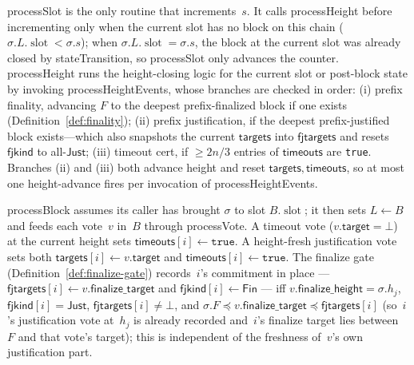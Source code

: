 \ifx\litemode\undefined\documentclass{article}\fi
\newcommand{\slot}[0]{\ensuremath{\operatorname{\mathrm{slot}}}}
\newcommand{\target}{\mathsf{target}}
\newcommand{\finalizeHeight}{\mathsf{finalize\_height}}
\newcommand{\finalizeTarget}{\mathsf{finalize\_target}}
\newcommand{\targets}{\mathsf{targets}}
\newcommand{\timeouts}{\mathsf{timeouts}}
\newcommand{\fjtargets}{\mathsf{fjtargets}}
\newcommand{\fjkind}{\mathsf{fjkind}}
\newcommand{\kjust}{\mathsf{Just}}
\newcommand{\kfin}{\mathsf{Fin}}
\newcommand{\stateTransition}{\textsf{stateTransition}\xspace}
\newcommand{\processSlot}{\textsf{processSlot}\xspace}
\newcommand{\processBlock}{\textsf{processBlock}\xspace}
\newcommand{\processHeight}{\textsf{processHeight}\xspace}
\newcommand{\processHeightEvents}{\textsf{processHeightEvents}\xspace}
\newcommand{\processVote}{\textsf{processVote}\xspace}
\theoremstyle{plain}
\theoremstyle{definition}
\theoremstyle{remark}
\begin{document}
\processSlot is the only routine that increments~$s$.
It calls \processHeight before incrementing only when the current slot has no block on this chain ($\sigma.L.\slot < \sigma.s$); when $\sigma.L.\slot = \sigma.s$, the block at the current slot was already closed by \stateTransition, so \processSlot only advances the counter.
\processHeight runs the height-closing logic for the current slot or post-block state by invoking \processHeightEvents, whose branches are checked in order: (i) prefix finality, advancing $F$ to the deepest prefix-finalized block if one exists (Definition~\ref{def:finality}); (ii) prefix justification, if the deepest prefix-justified block exists---which also snapshots the current $\targets$ into $\fjtargets$ and resets $\fjkind$ to all-$\kjust$; (iii) timeout cert, if $\geq 2n/3$ entries of $\timeouts$ are \texttt{true}.
Branches (ii) and (iii) both advance height and reset $\targets, \timeouts$, so at most one height-advance fires per invocation of \processHeightEvents.

\processBlock assumes its caller has brought $\sigma$ to slot $B.\slot$; it then sets $L \gets B$ and feeds each vote~$v$ in~$B$ through \processVote.
A timeout vote ($v.\target = \bot$) at the current height sets $\timeouts[i] \gets \mathtt{true}$.
A height-fresh justification vote sets both $\targets[i] \gets v.\target$ and $\timeouts[i] \gets \mathtt{true}$.
The finalize gate (Definition~\ref{def:finalize-gate}) records~$i$'s commitment in place --- $\fjtargets[i] \gets v.\finalizeTarget$ and $\fjkind[i] \gets \kfin$ --- iff $v.\finalizeHeight = \sigma.h_j$, $\fjkind[i] = \kjust$, $\fjtargets[i] \neq \bot$, and $\sigma.F \preceq v.\finalizeTarget \preceq \fjtargets[i]$ (so~$i$'s justification vote at~$h_j$ is already recorded and~$i$'s finalize target lies between~$F$ and that vote's target); this is independent of the freshness of~$v$'s own justification part.
\end{document}
